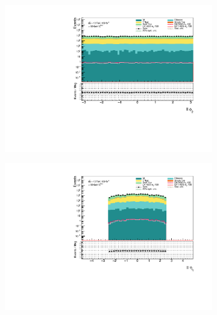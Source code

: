 \documentclass[12pt, a4paper]{book}
\begin{document}
\begin{figure}[!ht]
\begin{subfigure}[b]{0.49\textwidth}
    \end{subfigure}
    \hfill
    \begin{subfigure}[b]{0.49\textwidth}
        \centering
        \includegraphics[width=\textwidth]{phi2_ll.pdf}
    \end{subfigure}
    \begin{subfigure}[b]{0.49\textwidth}
        \centering
        \includegraphics[width=\textwidth]{eta1_ll.pdf}
    \end{subfigure}
    \hfill
    \begin{subfigure}[b]{0.49\textwidth}
        \centering

\end{subfigure}
\end{figure}
\end{document}
